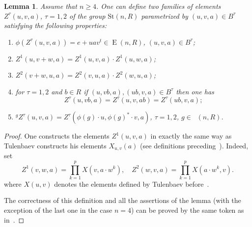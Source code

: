 \documentclass[oneside,12pt]{amsart}
\numberwithin{equation}{section}
\newtheorem{lem}{Lemma}
\numberwithin{lem}{section}
\theoremstyle{definition}
\theoremstyle{remark}
\DeclareMathOperator{\St}{St^G}
\DeclareMathOperator{\EE}{E}
\newcommand{\Stb}{\mathrm{St}}
\begin{document}
\begin{appendices}
\begin{lem} \label{lem:Zfacts}
Assume that $n \geq 4$.
One can define two families of elements $Z^\tau(u, v, a)$, $\tau=1,2$ of the group $\Stb(n, R)$ parametrized by $(u, v, a) \in B^\tau$ satisfying the following properties:
 \begin{enumerate}
  \item $\phi(Z^\tau(u, v, a)) = e + uav^t \in \EE(n, R)$, $(u,v,a) \in B^\tau$;
  \item $Z^{1}(u, v + w, a) = Z^{1}(u, v, a) \cdot Z^{1}(u, w, a)$;
  \item $Z^{2}(v + w, u, a) = Z^{2}(v, u, a) \cdot Z^{2}(w, u, a)$;
  \item for $\tau=1,2$ and $b \in R$ if $(u,vb,a), (ub, v, a) \in B^\tau$ then one has
   $$Z^\tau(u,vb, a) = Z^\tau(u, v, ab) = Z^\tau (ub, v, a);	$$
  \item ${}^{g}\! Z^{\tau}(u, v, a) = Z^{\tau}(\phi(g) \cdot u, \phi(g)^* \cdot v, a)$, $\tau = 1,2$, $g \in \St(n, R)$.
 \end{enumerate}
\end{lem}
\begin{proof}
One constructs the elements $Z^1(u,v,a)$ in exactly the same way as Tulenbaev constructs his elements $X_{u,v}(a)$ (see definitions preceding~\cite[Lemma~1.2]{Tu}).
Indeed, set \begin{equation} Z^1(v, w, a) = \prod\limits_{k=1}^p X(v, a \cdot w^k), \quad Z^2(w, v, a) = \prod\limits_{k=1}^p X(a \cdot w^k, v). \end{equation}
where $X(u, v)$ denotes the elements defined by Tulenbaev before~\cite[Lemma~1.1]{Tu}.

The correctness of this definition and all the assertions of the lemma (with the exception of the last one in the case $n=4$) can be proved by the same token as in~\cite[Lemma~1.3]{Tu}.
\end{proof}


\end{appendices}
\end{document}
